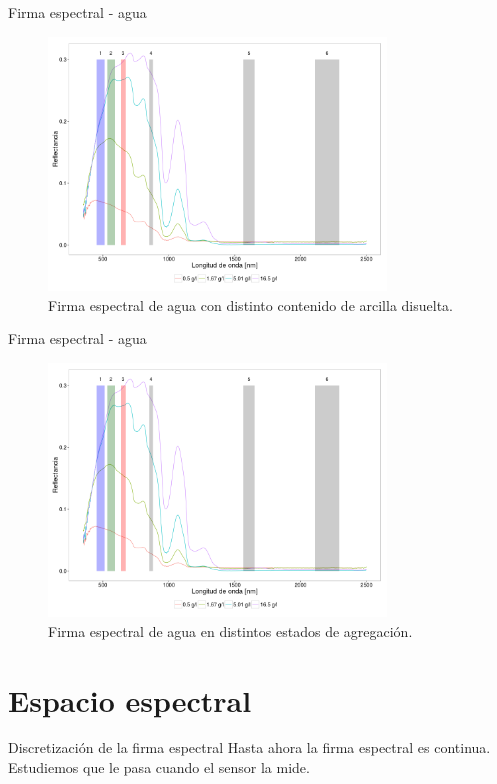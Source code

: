 \documentclass[handout]{beamer}
\begin{document}
\begin{frame}{Firma espectral - agua}
    \begin{figure}
    \centering
    \includegraphics[width=0.8\textwidth]{imagenes/waterm.png}
    \caption{Firma espectral de agua con distinto contenido de arcilla disuelta.}
    \end{figure}
\end{frame}

\begin{frame}{Firma espectral - agua}
    \begin{figure}
    \centering
    \includegraphics[width=0.8\textwidth]{imagenes/waterm.png}
    \caption{Firma espectral de agua en distintos estados de agregación.}
    \end{figure}
\end{frame}

\section{Espacio espectral}
\begin{frame}{Discretización de la firma espectral}
  Hasta ahora la firma espectral es continua. Estudiemos que le pasa cuando el sensor la mide.
\end{frame}
\end{document}

